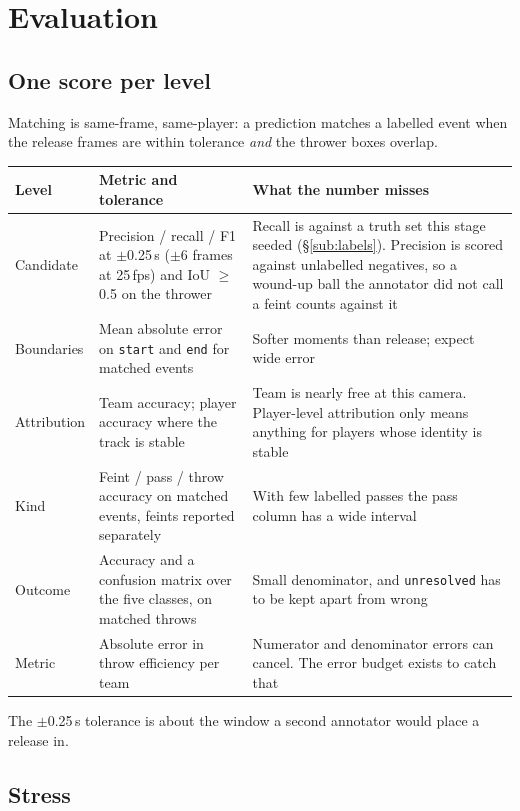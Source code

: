 \documentclass[10pt,a4paper]{article}
\begin{document}
\section{Evaluation}
\label{sec:eval}

\subsection{One score per level}

Matching is same-frame, same-player: a prediction matches a labelled event when the release
frames are within tolerance \emph{and} the thrower boxes overlap.

{\footnotesize
\begin{xltabular}{\textwidth}{L{26mm} L{40mm} X}
\toprule
\textbf{Level} & \textbf{Metric and tolerance} & \textbf{What the number misses}\\
\midrule
Candidate & Precision / recall / F1 at $\pm$0.25\,s ($\pm$6 frames at 25\,fps) and IoU $\geq$ 0.5 on the thrower & Recall is against a truth set this stage seeded (\S\ref{sub:labels}). Precision is scored against unlabelled negatives, so a wound-up ball the annotator did not call a feint counts against it\\
Boundaries & Mean absolute error on \texttt{start} and \texttt{end} for matched events & Softer moments than release; expect wide error\\
Attribution & Team accuracy; player accuracy where the track is stable & Team is nearly free at this camera. Player-level attribution only means anything for players whose identity is stable\\
Kind & Feint / pass / throw accuracy on matched events, feints reported separately & With few labelled passes the pass column has a wide interval\\
Outcome & Accuracy and a confusion matrix over the five classes, on matched throws & Small denominator, and \texttt{unresolved} has to be kept apart from wrong\\
Metric & Absolute error in throw efficiency per team & Numerator and denominator errors can cancel. The error budget exists to catch that\\
\bottomrule
\end{xltabular}}

The $\pm$0.25\,s tolerance is about the window a second annotator would place a release
in.

\subsection{Stress}
\end{document}
